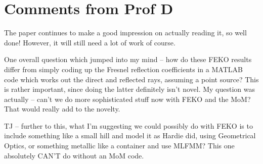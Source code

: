 \documentclass[]{article}
\begin{document}



\section{Comments from Prof D}
The paper continues to make a good impression on actually reading it, so well done! However, it will still need a lot of work of course. 
 
One overall question which jumped into my mind – how do these FEKO results differ from simply coding up the Fresnel reflection coefficients in a MATLAB code which works out the direct and reflected rays, assuming a point source? This is rather important, since doing the latter definitely isn’t novel.
My question was actually – can’t we do more sophisticated stuff now with FEKO and the MoM? That would really add to the novelty. 

TJ – further to this, what I’m suggesting we could possibly do with FEKO is to include something like a small hill and model it as Hardie did, using Geometrical Optics, or something metallic like a container and use MLFMM? This one absolutely CAN’T do without an MoM code.
\end{document}
